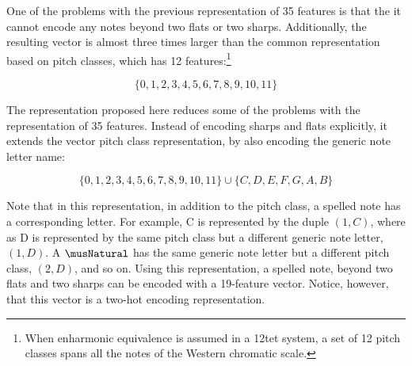 
One of the problems with the previous representation of 35
features is that the it cannot encode any notes beyond two
flats or two sharps. Additionally, the resulting vector is
almost three times larger than the common representation
based on pitch classes, which has 12 features:\footnote{When
enharmonic equivalence is assumed in a \gls{12tet} system, a
set of 12 pitch classes spans all the notes of the Western
chromatic scale.}

\begin{equation}
    \{0, 1, 2, 3, 4, 5, 6, 7, 8, 9, 10, 11\}
\end{equation}

The representation proposed here reduces some of the
problems with the representation of 35 features. Instead of
encoding sharps and flats explicitly, it extends the vector
pitch class representation, by also encoding the generic
note letter name:

\begin{equation}
    \{0, 1, 2, 3, 4, 5, 6, 7, 8, 9, 10, 11\} \cup \{C, D, E, F, G, A, B\}
\end{equation}

Note that in this representation, in addition to the pitch
class, a spelled note has a corresponding letter. For
example, C\musSharp{} is represented by the duple $(1, C)$,
where as D\musFlat{} is represented by the same pitch class
but a different generic note letter, $(1, D)$. A
$\musNatural$ has the same generic note letter but a
different pitch class, $(2, D)$, and so on. Using this
representation, a spelled note, beyond two flats and two
sharps can be encoded with a 19-feature vector. Notice,
however, that this vector is a two-hot encoding representation.
